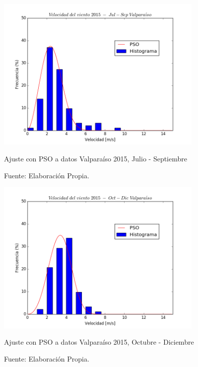 \begin{figure}[h!]
    \centering
    \includegraphics[height=75mm]{figures/result_2015_Jul-Sep.png}
    \caption{Ajuste con PSO a datos Valparaíso 2015, Julio - Septiembre}
    \vspace{-.25cm}
    \caption*{Fuente: Elaboración Propia.}
    \label{fig:pso_valpo_15_jul_sep}
\end{figure}
\begin{figure}[h!]
    \centering
    \includegraphics[height=75mm]{figures/result_2015_Oct-Dic.png}
    \caption{Ajuste con PSO a datos Valparaíso 2015, Octubre - Diciembre}
    \vspace{-.25cm}
    \caption*{Fuente: Elaboración Propia.}
    \label{fig:pso_valpo_15_oct_dic}
\end{figure}
